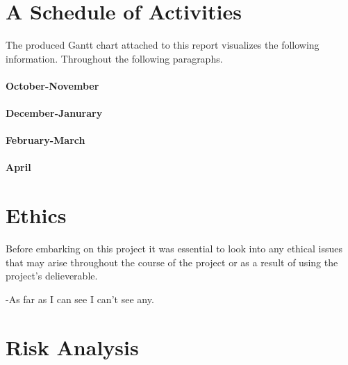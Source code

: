 \documentclass{report}
\begin{document}
\section{A Schedule of Activities}
The produced Gantt chart attached to this report visualizes the following information. Throughout the following paragraphs.

\paragraph{October-November}
\paragraph{December-Janurary}
\paragraph{February-March}
\paragraph{April}

\section{Ethics}
Before embarking on this project it was essential to look into any ethical issues that may arise throughout the course of the project or as a result of using the project's delieverable. 

-As far as I can see I can't see any.

\section{Risk Analysis}


%



\end{document}
